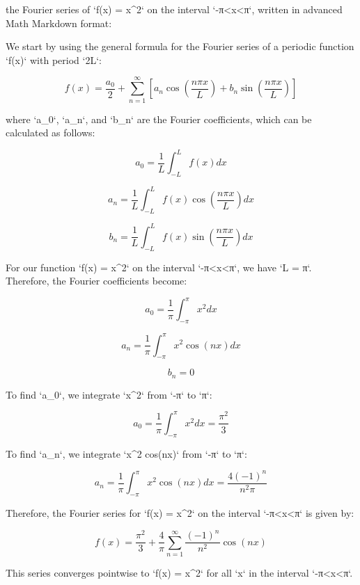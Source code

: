 the Fourier series of `f(x) = x^2` on the interval `-π<x<π`, written in advanced Math Markdown format:

We start by using the general formula for the Fourier series of a periodic function `f(x)` with period `2L`:

$$
f(x) = \frac{a_0}{2} + \sum_{n=1}^{\infty} [a_n \cos(\frac{n\pi x}{L}) + b_n \sin(\frac{n\pi x}{L})]
$$

where `a_0`, `a_n`, and `b_n` are the Fourier coefficients, which can be calculated as follows:

$$
a_0 = \frac{1}{L} \int_{-L}^{L} f(x) dx
$$

$$
a_n = \frac{1}{L} \int_{-L}^{L} f(x) \cos(\frac{n\pi x}{L}) dx
$$

$$
b_n = \frac{1}{L} \int_{-L}^{L} f(x) \sin(\frac{n\pi x}{L}) dx
$$

For our function `f(x) = x^2` on the interval `-π<x<π`, we have `L = π`. Therefore, the Fourier coefficients become:

$$
a_0 = \frac{1}{\pi} \int_{-\pi}^{\pi} x^2 dx
$$

$$
a_n = \frac{1}{\pi} \int_{-\pi}^{\pi} x^2 \cos(nx) dx
$$

$$
b_n = 0
$$

To find `a_0`, we integrate `x^2` from `-π` to `π`:

$$
a_0 = \frac{1}{\pi} \int_{-\pi}^{\pi} x^2 dx = \frac{\pi^2}{3}
$$

To find `a_n`, we integrate `x^2 cos(nx)` from `-π` to `π`:

$$
a_n = \frac{1}{\pi} \int_{-\pi}^{\pi} x^2 \cos(nx) dx = \frac{4(-1)^n}{n^2\pi}
$$

Therefore, the Fourier series for `f(x) = x^2` on the interval `-π<x<π` is given by:

$$
f(x) = \frac{\pi^2}{3} + \frac{4}{\pi} \sum_{n=1}^{\infty} \frac{(-1)^n}{n^2} \cos(nx)
$$

This series converges pointwise to `f(x) = x^2` for all `x` in the interval `-π<x<π`.
